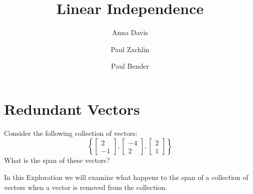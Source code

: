 \documentclass{ximera}
\author{Anna Davis \and Paul Zachlin \and Paul Bender} \title{Linear Independence} \license{CC-BY 4.0}
\begin{document}
\begin{abstract}
 \end{abstract}
\maketitle

\section*{Redundant Vectors}

\begin{exploration}\label{exp:redundantVecs1}
Consider the following collection of vectors:
$$\left\{\begin{bmatrix}2\\-1\end{bmatrix}, \begin{bmatrix}-4\\2\end{bmatrix}, \begin{bmatrix}2\\1\end{bmatrix}\right\}$$
What is the span of these vectors?  

In this Exploration we will examine what happens to the span of a collection of vectors when a vector is removed from the collection.  


\end{exploration}
\end{document}
